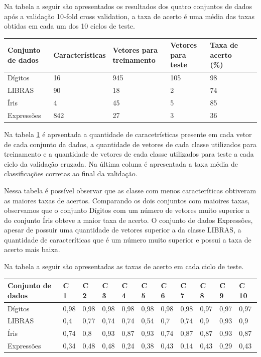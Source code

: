 Na tabela a seguir são apresentados os resultados dos quatro conjuntos de dados após a validação 10-fold cross validation, a taxa de acerto é uma média das taxas obtidas em cada um dos 10 ciclos de teste. 

\begin{table}[h!]
	\begin{tabular}{|l|l|l|l|p{2cm}|p{3cm}|p{2cm}|}
        \hline
	Conjunto de dados  & Características & Vetores para treinamento & Vetores para teste & Taxa de acerto (\%)\\ \hline
    	Dígitos    &        16       & 945   & 105 & 98\\ \hline
   	LIBRAS     &        90       &  18   &   2 & 74\\ \hline
    	Íris       &         4       &  45   &   5 & 85\\ \hline
    	Expressões &       842       &  27   &   3 & 36\\ \hline
	\end{tabular}
	\label{tab:resultados}
\end{table}

Na tabela \ref{tab:resultados} é aprsentada a quantidade de caracetrísticas presente em cada vetor de cada conjunto da dados, a quantidade de vetores de cada classe utilizados para treinamento e a quantidade de vetores de cada classe utilizados para teste a cada ciclo da validação cruzada. Na última coluna é apresentada a taxa média de classificações corretas ao final da validação.

Nessa tabela é possível observar que as classe com menos caracteríticas obtiveram as maiores taxas de acertos. Comparando os dois conjuntos com maioires taxas, observamos que o conjunto Dígitos com um número de vetores muito superior a do conjunto Íris obteve a maior taxa de acerto. O conjunto de dados Expressões, apesar de possuir uma quantidade de vetores superior a da classe LIBRAS, a quantidade de caracteríticas que é um número muito superior e possui a taxa de acerto mais baixa. 

Na tabela a seguir são apresentadas as taxas de acerto em cada ciclo de teste.

\begin{table}[h!]
	\begin{tabular}{|l|l|l|l|l|l|l|l|l|l|l|}
        \hline
	Conjunto de dados  & C 1 & C 2 & C 3 & C 4 & C 5 & C 6 & C 7 & C 8 & C 9 & C 10 \\ \hline
    	Dígitos   & 0,98 & 0,98 & 0,98 & 0,98 & 0,98 & 0,98 & 0,98 & 0,97 & 0,97 & 0,97\\ \hline
   	LIBRAS    & 0,4  & 0,77 & 0,74 & 0,74 & 0,54 & 0,7  & 0,74 & 0,9  & 0,93 & 0,9 \\ \hline
    	Íris      & 0,74 & 0,8  & 0,93 & 0,87 & 0,93 & 0,74 & 0,87 & 0,87 & 0,93 & 0,87\\ \hline
    	Expressões& 0,34 & 0,48 & 0,48 & 0,24 & 0,38 & 0,43 & 0,14 & 0,43 & 0,29 & 0,43\\ \hline
	\end{tabular}
	\label{tab:taxas}
\end{table}

